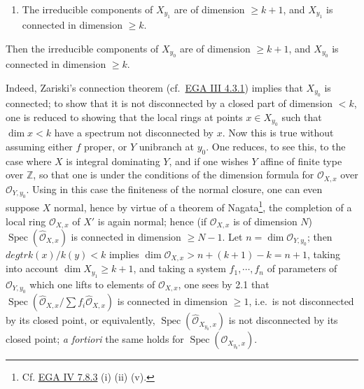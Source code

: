 \documentclass[
  11pt,
  a4paper,
]{book}
\providecommand{\tightlist}{%
  \setlength{\itemsep}{0pt}\setlength{\parskip}{0pt}}
\begin{document}
\begin{enumerate}
\def\labelenumi{\alph{enumi})}
\setcounter{enumi}{1}
\tightlist
\item
  The irreducible components of \(X_{y_{1}}\) are of dimension
  \(\geqslant k + 1\), and \(X_{y_{1}}\) is connected in dimension
  \(\geqslant k\).
\end{enumerate}

Then the irreducible components of \(X_{y_{0}}\) are of dimension
\(\geqslant k + 1\), and \(X_{y_{0}}\) is connected in dimension
\(\geqslant k\).

Indeed, Zariski's connection theorem
(cf.~\href{https://jcreinhold.github.io/ega/iii/11-ch3-04-fundamental-theorem-proper-morphisms.html\#43-zariskis-connection-theorem}{EGA
III 4.3.1}) implies that \(X_{y_{0}}\) is connected; to show that it is
not disconnected by a closed part of dimension \(< k\), one is reduced
to showing that the local rings at points \(x \in
X_{y_{0}}\) such that \(\dim x < k\) have a spectrum not disconnected by
\(x\). Now this is true without assuming either \(f\) proper, or \(Y\)
unibranch at \(y_{0}\). One reduces, to see this, to the case where
\(X\) is integral dominating \(Y\), and if one wishes \(Y\) affine of
finite type over \(\mathbb{Z}\), so that one is under the conditions of
the dimension formula for \(\mathcal{O}_{X,x}\) over
\(\mathcal{O}_{Y,y_{0}}\). Using in this case the finiteness of the
normal closure, one can even suppose \(X\) normal, hence by virtue of a
theorem of Nagata\footnote{Cf.
  \href{https://jcreinhold.github.io/ega/iv/19-ch4-07-noetherian-completion.html\#78-excellent-rings}{EGA
  IV 7.8.3} (i) (ii) (v).}, the completion of a local ring
\(\mathcal{O}_{X,x}\) of \(X'\) is again normal; hence (if
\(\mathcal{O}_{X,x}\) is of dimension \(N\))
\(\operatorname{Spec}(\hat{\mathcal{O}}_{X,x})\) is connected in
dimension \(\geqslant N - 1\). Let \(n = \dim
\mathcal{O}_{Y,y_{0}}\); then \(deg tr k(x)/k(y) < k\) implies
\(\dim \mathcal{O}_{X,x} > n + (k + 1) - k = n + 1\), taking into
account \(\dim X_{y_{1}} \geqslant k + 1\), and taking a system
\(f_{1}, \cdots, f_{n}\) of parameters of \(\mathcal{O}_{Y,y_{0}}\)
which one lifts to elements of \(\mathcal{O}_{X,x}\), one sees by 2.1
that
\(\operatorname{Spec}(\hat{\mathcal{O}}_{X,x} / \sum f_{i} \hat{\mathcal{O}}_{X,x})\)
is connected in dimension \(\geqslant
1\), i.e.~is not disconnected by its closed point, or equivalently,
\(\operatorname{Spec}(\hat{\mathcal{O}}_{X_{y_{0}},x})\) is not
disconnected by its closed point; \emph{a fortiori} the same holds for
\(\operatorname{Spec}(\mathcal{O}_{X_{y_{0}},x})\).
\end{document}
